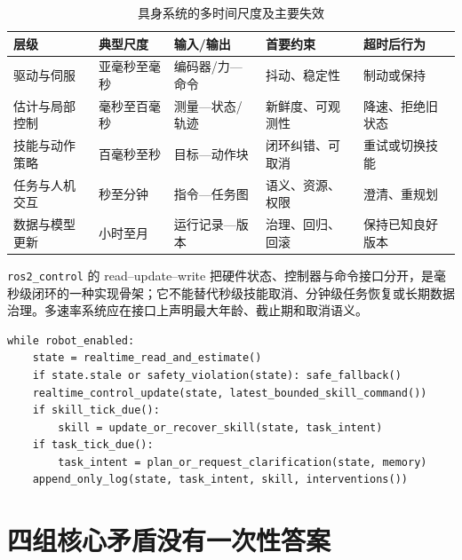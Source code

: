 \begin{table}[H]
\begingroup
{}
\centering
\caption{具身系统的多时间尺度及主要失效}
\label{tab:common-timescales}
\begin{tabularx}{\textwidth}{p{}p{}YYp{0.20\textwidth}}
\toprule
层级 & 典型尺度 & 输入/输出 & 首要约束 & 超时后行为 \\
\midrule
驱动与伺服 & 亚毫秒至毫秒 & 编码器/力—命令 & 抖动、稳定性 & 制动或保持 \\
估计与局部控制 & 毫秒至百毫秒 & 测量—状态/轨迹 & 新鲜度、可观测性 & 降速、拒绝旧状态 \\
技能与动作策略 & 百毫秒至秒 & 目标—动作块 & 闭环纠错、可取消 & 重试或切换技能 \\
任务与人机交互 & 秒至分钟 & 指令—任务图 & 语义、资源、权限 & 澄清、重规划 \\
数据与模型更新 & 小时至月 & 运行记录—版本 & 治理、回归、回滚 & 保持已知良好版本 \\
\bottomrule
\end{tabularx}
\endgroup
\end{table}

\texttt{ros2\_control} 的 read--update--write 把硬件状态、控制器与命令接口分开\cite{ros2control2026}，是毫秒级闭环的一种实现骨架；它不能替代秒级技能取消、分钟级任务恢复或长期数据治理。多速率系统应在接口上声明最大年龄、截止期和取消语义。

\begin{lstlisting}[caption={多速率具身运行时的教学骨架；各回路必须在独立调度与测试中实现}]
while robot_enabled:
    state = realtime_read_and_estimate()
    if state.stale or safety_violation(state): safe_fallback()
    realtime_control_update(state, latest_bounded_skill_command())
    if skill_tick_due():
        skill = update_or_recover_skill(state, task_intent)
    if task_tick_due():
        task_intent = plan_or_request_clarification(state, memory)
    append_only_log(state, task_intent, skill, interventions())
\end{lstlisting}

\section{四组核心矛盾没有一次性答案}

